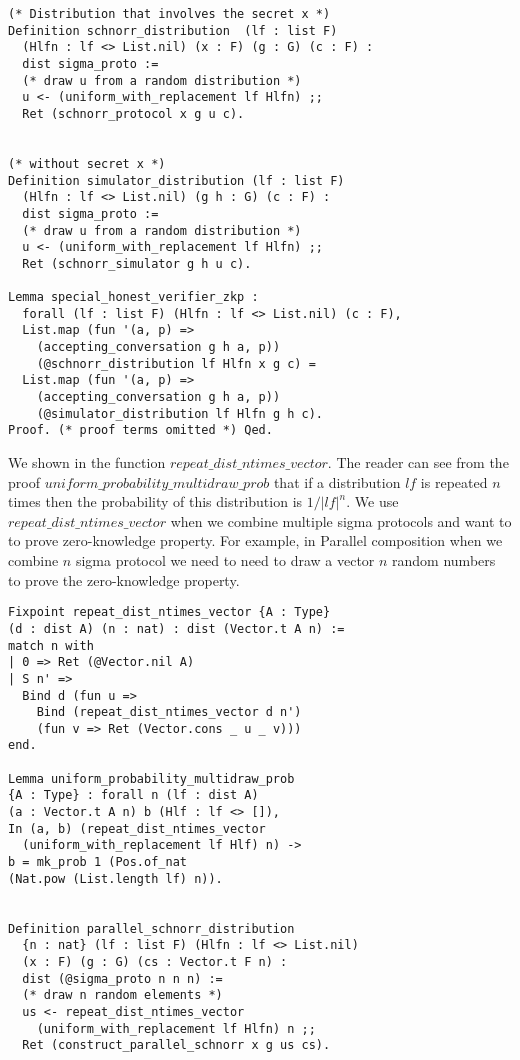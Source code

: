 \documentclass[conference,compsoc]{IEEEtran}
\begin{document}
\begin{lstlisting}[frame=single, language=Coq, caption={Definition of Natural Number},
  label={ind_nat},captionpos=t, basicstyle=\ttfamily\footnotesize,
  abovecaptionskip=-\medskipamount]
(* Distribution that involves the secret x *)
Definition schnorr_distribution  (lf : list F) 
  (Hlfn : lf <> List.nil) (x : F) (g : G) (c : F) : 
  dist sigma_proto :=
  (* draw u from a random distribution *)
  u <- (uniform_with_replacement lf Hlfn) ;;
  Ret (schnorr_protocol x g u c).

  
(* without secret x *)
Definition simulator_distribution (lf : list F) 
  (Hlfn : lf <> List.nil) (g h : G) (c : F) : 
  dist sigma_proto :=
  (* draw u from a random distribution *)
  u <- (uniform_with_replacement lf Hlfn) ;;
  Ret (schnorr_simulator g h u c).
  
Lemma special_honest_verifier_zkp : 
  forall (lf : list F) (Hlfn : lf <> List.nil) (c : F), 
  List.map (fun '(a, p) => 
    (accepting_conversation g h a, p))
    (@schnorr_distribution lf Hlfn x g c) = 
  List.map (fun '(a, p) => 
    (accepting_conversation g h a, p))
    (@simulator_distribution lf Hlfn g h c).
Proof. (* proof terms omitted *) Qed. 
  \end{lstlisting}


We shown in the function $repeat\_dist\_ntimes\_vector$.
  The reader can see from the proof 
  $uniform\_probability\_multidraw\_prob$
  that if a distribution $lf$ is repeated 
  $n$ times then the probability of this distribution 
  is $1/|lf|^n$. We use $repeat\_dist\_ntimes\_vector$ 
  when we combine multiple sigma protocols and 
  want to to prove zero-knowledge property. For example, 
  in Parallel composition when we combine $n$ sigma protocol 
  we need to need to draw a vector $n$ random numbers to 
  prove the zero-knowledge property. 
  
  \begin{lstlisting}[frame=single, language=Coq, caption={Definition of Natural Number},
    label={ind_nat},captionpos=t, basicstyle=\ttfamily\footnotesize,
    abovecaptionskip=-\medskipamount]
Fixpoint repeat_dist_ntimes_vector {A : Type} 
(d : dist A) (n : nat) : dist (Vector.t A n) := 
match n with 
| 0 => Ret (@Vector.nil A)
| S n' => 
  Bind d (fun u => 
    Bind (repeat_dist_ntimes_vector d n')
    (fun v => Ret (Vector.cons _ u _ v)))
end.

Lemma uniform_probability_multidraw_prob 
{A : Type} : forall n (lf : dist A) 
(a : Vector.t A n) b (Hlf : lf <> []), 
In (a, b) (repeat_dist_ntimes_vector 
  (uniform_with_replacement lf Hlf) n) ->
b = mk_prob 1 (Pos.of_nat 
(Nat.pow (List.length lf) n)).


Definition parallel_schnorr_distribution  
  {n : nat} (lf : list F) (Hlfn : lf <> List.nil) 
  (x : F) (g : G) (cs : Vector.t F n) : 
  dist (@sigma_proto n n n) :=
  (* draw n random elements *)
  us <- repeat_dist_ntimes_vector 
    (uniform_with_replacement lf Hlfn) n ;;
  Ret (construct_parallel_schnorr x g us cs).
\end{lstlisting}
\end{document}
